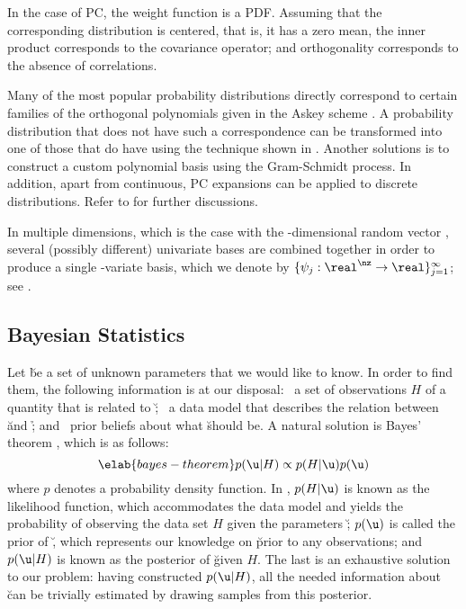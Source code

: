 In the case of \ac{PC}, the weight function is a \ac{PDF}. Assuming that the
corresponding distribution is centered, that is, it has a zero mean, the inner
product corresponds to the covariance operator; and orthogonality corresponds to
the absence of correlations.

Many of the most popular probability distributions directly correspond to
certain families of the orthogonal polynomials given in the Askey scheme
\cite{xiu2010}. A probability distribution that does not have such a
correspondence can be transformed into one of those that do have using the
technique shown in . Another solutions is to
construct a custom polynomial basis using the Gram-Schmidt process. In addition,
apart from continuous, PC expansions can be applied to discrete distributions.
Refer to \cite{xiu2010} for further discussions.

In multiple dimensions, which is the case with the \nz-dimensional random vector
\vz, several (possibly different) univariate bases are combined together in
order to produce a single \nz-variate basis, which we denote by $\{ \psi_j:
\real^\nz \to \real \}_{j = 1}^\infty$; see \cite{xiu2010}.

\subsection{Bayesian Statistics}

Let \u be a set of unknown parameters that we would like to know. In order to
find them, the following information is at our disposal: \one~a set of
observations $H$ of a quantity \h that is related to \u; \two~a data model that
describes the relation between \u and \h; and \three~prior beliefs about what \u
should be. A natural solution is Bayes' theorem \cite{gelman2004}, which is as
follows:
\begin{equation} \elab{bayes-theorem}
  p(\u | H) \propto p(H | \u) p(\u)
\end{equation}
where $p$ denotes a probability density function. In , $p(H
| \u)$ is known as the likelihood function, which accommodates the data model
and yields the probability of observing the data set $H$ given the parameters
\u; $p(\u)$ is called the prior of \u, which represents our knowledge on \u
prior to any observations; and $p(\u | H)$ is known as the posterior of \u given
$H$. The last is an exhaustive solution to our problem: having constructed $p(\u
| H)$, all the needed information about \u can be trivially estimated by drawing
samples from this posterior.

